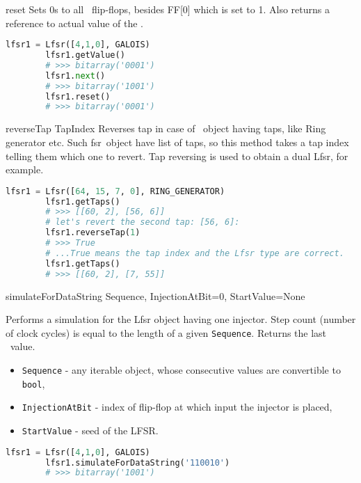  {reset} {} {
	Sets 0s to all \Lfsr\ flip-flops, besides FF[0] which is set to 1. Also returns a reference to actual value of the \Lfsr.
}
\begin{lstlisting}[language=Python]
		lfsr1 = Lfsr([4,1,0], GALOIS)
		lfsr1.getValue()
		# >>> bitarray('0001')
		lfsr1.next()
		# >>> bitarray('1001')
		lfsr1.reset()
		# >>> bitarray('0001')
\end{lstlisting}

 {reverseTap} {TapIndex} {
	Reverses tap in case of \Lfsr\ object having taps, like Ring generator etc. Such \:fsr\ object have list of taps, so this method takes a tap index telling them which one to revert. Tap reversing is used to obtain a dual Lfsr, for example.
}
\begin{lstlisting}[language=Python]
		lfsr1 = Lfsr([64, 15, 7, 0], RING_GENERATOR)
		lfsr1.getTaps()
		# >>> [[60, 2], [56, 6]]
		# let's revert the second tap: [56, 6]:
		lfsr1.reverseTap(1)
		# >>> True
		# ...True means the tap index and the Lfsr type are correct.
		lfsr1.getTaps()
		# >>> [[60, 2], [7, 55]]
\end{lstlisting}

 {simulateForDataString} {Sequence, InjectionAtBit=0, StartValue=None} {
	Performs a simulation for the Lfsr object having one injector. Step count (number of clock cycles) is equal to the length of a given \texttt{Sequence}. Returns the last \Lfsr\ value.
	\begin{itemize}
		\item \texttt{Sequence} - any iterable object, whose consecutive values are convertible to \texttt{bool},
		\item \texttt{InjectionAtBit} - index of flip-flop at which input the injector is placed,
		\item \texttt{StartValue} - seed of the LFSR.
	\end{itemize}
}
\begin{lstlisting}[language=Python]
		lfsr1 = Lfsr([4,1,0], GALOIS)
		lfsr1.simulateForDataString('110010')
		# >>> bitarray('1001')
\end{lstlisting}

